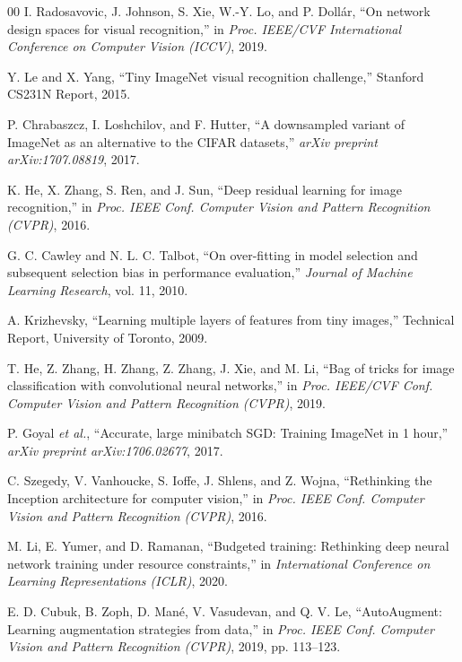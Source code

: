 \documentclass[conference]{IEEEtran}
\begin{document}
\begin{thebibliography}{00}
I. Radosavovic, J. Johnson, S. Xie, W.-Y. Lo, and P. Dollár, ``On network design spaces for visual recognition,'' in \textit{Proc. IEEE/CVF International Conference on Computer Vision (ICCV)}, 2019.

Y. Le and X. Yang, ``Tiny ImageNet visual recognition challenge,'' Stanford CS231N Report, 2015.

P. Chrabaszcz, I. Loshchilov, and F. Hutter, ``A downsampled variant of ImageNet as an alternative to the CIFAR datasets,'' \textit{arXiv preprint arXiv:1707.08819}, 2017.

K. He, X. Zhang, S. Ren, and J. Sun, ``Deep residual learning for image recognition,'' in \textit{Proc. IEEE Conf. Computer Vision and Pattern Recognition (CVPR)}, 2016.

G. C. Cawley and N. L. C. Talbot, ``On over-fitting in model selection and subsequent selection bias in performance evaluation,'' \textit{Journal of Machine Learning Research}, vol. 11, 2010.

A. Krizhevsky, ``Learning multiple layers of features from tiny images,'' Technical Report, University of Toronto, 2009.

T. He, Z. Zhang, H. Zhang, Z. Zhang, J. Xie, and M. Li, ``Bag of tricks for image classification with convolutional neural networks,'' in \textit{Proc. IEEE/CVF Conf. Computer Vision and Pattern Recognition (CVPR)}, 2019.

P. Goyal \textit{et al.}, ``Accurate, large minibatch SGD: Training ImageNet in 1 hour,'' \textit{arXiv preprint arXiv:1706.02677}, 2017.

C. Szegedy, V. Vanhoucke, S. Ioffe, J. Shlens, and Z. Wojna, ``Rethinking the Inception architecture for computer vision,'' in \textit{Proc. IEEE Conf. Computer Vision and Pattern Recognition (CVPR)}, 2016.

M. Li, E. Yumer, and D. Ramanan, ``Budgeted training: Rethinking deep neural network training under resource constraints,'' in \textit{International Conference on Learning Representations (ICLR)}, 2020.

E. D. Cubuk, B. Zoph, D. Mané, V. Vasudevan, and Q. V. Le, ``AutoAugment: Learning augmentation strategies from data,'' in \textit{Proc. IEEE Conf. Computer Vision and Pattern Recognition (CVPR)}, 2019, pp. 113--123.


\end{thebibliography}
\end{document}
